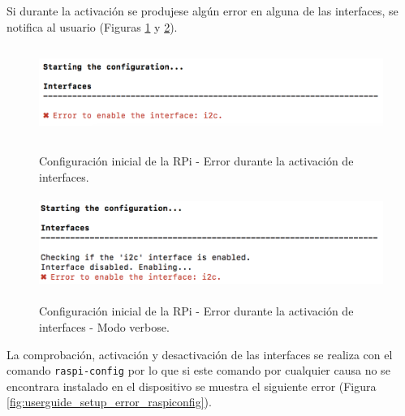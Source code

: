 \documentclass[12pt,a4paper, twoside]{report}
\begin{document}
	Si durante la activación se produjese algún error en alguna de las interfaces, se notifica al usuario (Figuras \ref{fig:userguide_setup_error_enableinterface} y \ref{fig:userguide_setup_error_enableinterface_verbose}).

	\begin{figure}[!ht]   
		\caption{Configuración inicial de la RPi - Error durante la activación de interfaces.} 
		\begin{center} 
			\includegraphics[width=14cm,height=3cm]{Images/userGuide/setup/enableInterfaceError} \\
			\label{fig:userguide_setup_error_enableinterface} 
		\end{center}  
	\end{figure}
	
	\begin{figure}[!ht]   
		\caption{Configuración inicial de la RPi - Error durante la activación de interfaces - Modo verbose.} 
		\begin{center} 
			\includegraphics[width=14cm,height=3cm]{Images/userGuide/setup/enableInterfaceVerboseError.png} \\
			\label{fig:userguide_setup_error_enableinterface_verbose} 
		\end{center}  
	\end{figure}
	
	La comprobación, activación y desactivación de las interfaces se realiza con el comando \texttt{raspi-config} por lo que si este comando por cualquier causa no se encontrara instalado en el dispositivo se muestra el siguiente error (Figura \ref{fig:userguide_setup_error_raspiconfig}).
\end{document}
